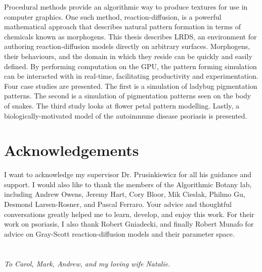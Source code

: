 \documentclass{thesis}
\newcommand{\ProgramName}{LRDS}
\theoremstyle{plain}
\theoremstyle{definition}
\begin{document}

  \begin{thesisabstract}  
Procedural methods provide an algorithmic way to produce textures for use in computer graphics. One such method, reaction-diffusion, is a powerful mathematical approach that describes natural pattern formation in terms of chemicals known as morphogens. This thesis describes \ProgramName{}, an environment for authoring reaction-diffusion models directly on arbitrary surfaces. Morphogens, their behaviours, and the domain in which they reside can be quickly and easily defined. By performing computation on the GPU, the pattern forming simulation can be interacted with in real-time, facilitating productivity and experimentation. Four case studies are presented. The first is a simulation of ladybug pigmentation patterns. The second is a simulation of pigmentation patterns seen on the body of snakes. The third study looks at flower petal pattern modelling. Lastly, a biologically-motivated model of the autoimmune disease psoriasis is presented.
  \end{thesisabstract}


  \chapter{Acknowledgements}  
I want to acknowledge my supervisor Dr. Prusinkiewicz for all his guidance and support. I would also like to thank the members of the Algorithmic Botany lab, including Andrew Owens, Jeremy Hart, Cory Bloor, Mik Cieslak, Philmo Gu, Desmond Larsen-Rosner, and Pascal Ferraro. Your advice and thoughtful conversations greatly helped me to learn, develop, and enjoy this work. For their work on psoriasis, I also thank Robert Gniadecki, and finally Robert Munafo for advice on Gray-Scott reaction-diffusion models and their parameter space.

    
  \chapter[Dedication]{}
  \begin{dedication}
    \emph{To Carol, Mark, Andrew, and my loving wife Natalie.} 
  \end{dedication}
\end{document}
